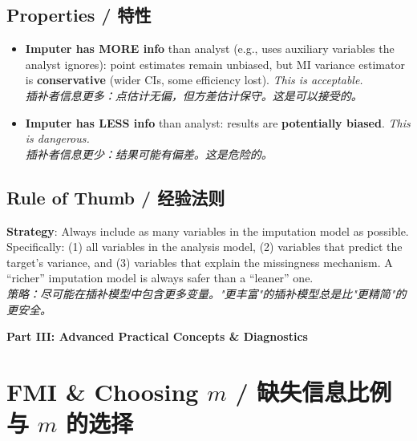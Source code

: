 \documentclass[9pt, a4paper]{article}
\begin{document}
\subsection{Properties / 特性}
\begin{itemize}
    \item \textbf{Imputer has MORE info} than analyst (e.g., uses auxiliary variables the analyst ignores): point estimates remain unbiased, but MI variance estimator is \textbf{conservative} (wider CIs, some efficiency lost). \textit{This is acceptable.}\\
    \textit{插补者信息更多：点估计无偏，但方差估计保守。这是可以接受的。}
    \item \textbf{Imputer has LESS info} than analyst: results are \textbf{potentially biased}. \textit{This is dangerous.}\\
    \textit{插补者信息更少：结果可能有偏差。这是危险的。}
\end{itemize}

\subsection{Rule of Thumb / 经验法则}
\begin{tcolorbox}[summarybox]
    \textbf{Strategy}: Always include as many variables in the imputation model as possible. Specifically: (1) all variables in the analysis model, (2) variables that predict the target's variance, and (3) variables that explain the missingness mechanism. A ``richer'' imputation model is always safer than a ``leaner'' one.\\
    \textit{策略：尽可能在插补模型中包含更多变量。"更丰富"的插补模型总是比"更精简"的更安全。}
\end{tcolorbox}

\begin{center}
    \Large \textbf{Part III: Advanced Practical Concepts \& Diagnostics}
\end{center}

\section{FMI \& Choosing $m$ / 缺失信息比例与 $m$ 的选择}
\end{document}
